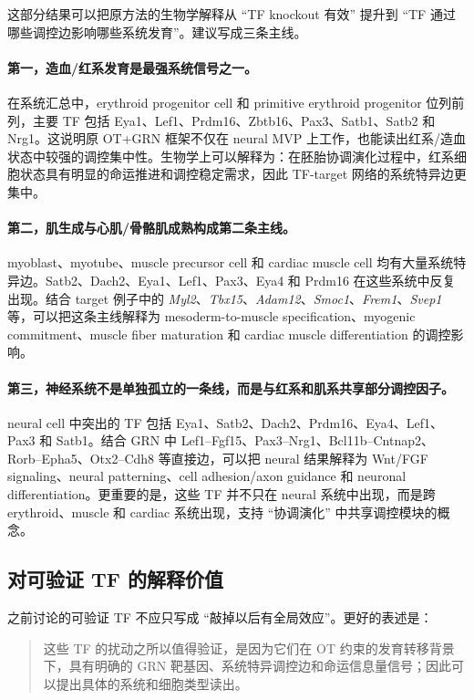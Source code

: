 \documentclass[UTF8,12pt]{ctexart}
\newcommand{\GRN}{\textsc{GRN}}
\begin{document}
这部分结果可以把原方法的生物学解释从 ``TF knockout 有效'' 提升到 ``TF 通过哪些调控边影响哪些系统发育''。建议写成三条主线。

\paragraph{第一，造血/红系发育是最强系统信号之一。}
在系统汇总中，erythroid progenitor cell 和 primitive erythroid progenitor 位列前列，主要 TF 包括 Eya1、Lef1、Prdm16、Zbtb16、Pax3、Satb1、Satb2 和 Nrg1。这说明原 OT+\GRN{} 框架不仅在 neural MVP 上工作，也能读出红系/造血状态中较强的调控集中性。生物学上可以解释为：在胚胎协调演化过程中，红系细胞状态具有明显的命运推进和调控稳定需求，因此 TF-target 网络的系统特异边更集中。

\paragraph{第二，肌生成与心肌/骨骼肌成熟构成第二条主线。}
myoblast、myotube、muscle precursor cell 和 cardiac muscle cell 均有大量系统特异边。Satb2、Dach2、Eya1、Lef1、Pax3、Eya4 和 Prdm16 在这些系统中反复出现。结合 target 例子中的 \textit{Myl2}、\textit{Tbx15}、\textit{Adam12}、\textit{Smoc1}、\textit{Frem1}、\textit{Svep1} 等，可以把这条主线解释为 mesoderm-to-muscle specification、myogenic commitment、muscle fiber maturation 和 cardiac muscle differentiation 的调控影响。

\paragraph{第三，神经系统不是单独孤立的一条线，而是与红系和肌系共享部分调控因子。}
neural cell 中突出的 TF 包括 Eya1、Satb2、Dach2、Prdm16、Eya4、Lef1、Pax3 和 Satb1。结合 \GRN{} 中 Lef1--Fgf15、Pax3--Nrg1、Bcl11b--Cntnap2、Rorb--Epha5、Otx2--Cdh8 等直接边，可以把 neural 结果解释为 Wnt/FGF signaling、neural patterning、cell adhesion/axon guidance 和 neuronal differentiation。更重要的是，这些 TF 并不只在 neural 系统中出现，而是跨 erythroid、muscle 和 cardiac 系统出现，支持 ``协调演化'' 中共享调控模块的概念。

\subsection{对可验证 TF 的解释价值}

之前讨论的可验证 TF 不应只写成 ``敲掉以后有全局效应''。更好的表述是：

\begin{quote}
这些 TF 的扰动之所以值得验证，是因为它们在 OT 约束的发育转移背景下，具有明确的 \GRN{} 靶基因、系统特异调控边和命运信息量信号；因此可以提出具体的系统和细胞类型读出。
\end{quote}
\end{document}
